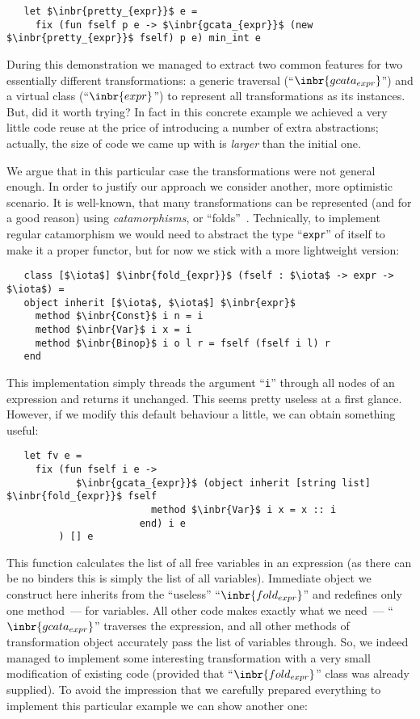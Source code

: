 \begin{lstlisting}
   let $\inbr{pretty_{expr}}$ e =
     fix (fun fself p e -> $\inbr{gcata_{expr}}$ (new $\inbr{pretty_{expr}}$ fself) p e) min_int e
\end{lstlisting}

During this demonstration we managed to extract two common features for two essentially different transformations: a generic traversal (``$\inbr{gcata_{expr}}$'')
and a virtual class (``$\inbr{expr}$'') to represent all transformations as its instances. But, did it worth trying? In fact in this concrete example we achieved a
very little code reuse at the price of introducing a number of extra abstractions; actually, the size of code we came up with is \emph{larger} than the initial one.

We argue that in this particular case the transformations were not general enough. In order to justify our approach we consider another, more optimistic scenario. It is
well-known, that many transformations can be represented (and for a good reason) using \emph{catamorphisms}, or ``folds''~\cite{Fold,Bananas,CalculatingFP}. Technically, to
implement regular catamorphism we would need to abstract the type ``\lstinline{expr}'' of itself to make it a proper functor, but for now we stick with a more
lightweight version:

\begin{lstlisting}
   class [$\iota$] $\inbr{fold_{expr}}$ (fself : $\iota$ -> expr -> $\iota$) =
   object inherit [$\iota$, $\iota$] $\inbr{expr}$ 
     method $\inbr{Const}$ i n = i
     method $\inbr{Var}$ i x = i
     method $\inbr{Binop}$ i o l r = fself (fself i l) r
   end
\end{lstlisting}

This implementation simply threads the argument ``\lstinline{i}'' through all nodes of an expression and returns it unchanged. This seems pretty useless at a first
glance. However, if we modify this default behaviour a little, we can obtain something useful:

\begin{lstlisting}
   let fv e =
     fix (fun fself i e ->
            $\inbr{gcata_{expr}}$ (object inherit [string list] $\inbr{fold_{expr}}$ fself
                         method $\inbr{Var}$ i x = x :: i
                       end) i e
         ) [] e
\end{lstlisting}

This function calculates the list of all free variables in an expression (as there can be no binders this is simply the list of all variables). Immediate object we
construct here inherits from the ``useless'' ``$\inbr{fold_{expr}}$'' and redefines only one method~--- for variables. All other code makes exactly what we need~---
``$\inbr{gcata_{expr}}$'' traverses the expression, and all other methods of transformation object accurately pass the list of variables through. So, we indeed
managed to implement some interesting transformation with a very small modification of existing code (provided that ``$\inbr{fold_{expr}}$'' class was already supplied).
To avoid the impression that we carefully prepared everything to implement this particular example we can show another one:

